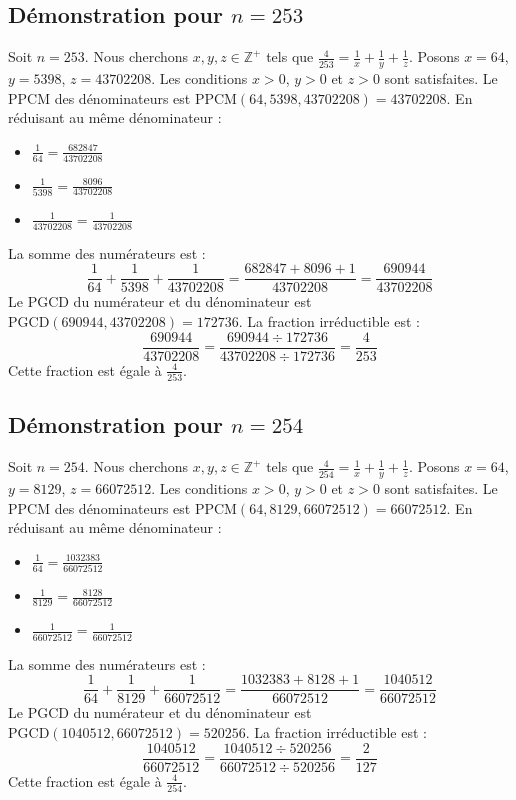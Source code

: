 \documentclass[11pt,a4paper]{article}
\begin{document}
\subsection{Démonstration pour $n = 253$}
Soit $n = 253$. Nous cherchons $x, y, z \in \mathbb{Z}^{+}$ tels que $\frac{4}{253} = \frac{1}{x} + \frac{1}{y} + \frac{1}{z}$.
Posons $x = 64$, $y = 5398$, $z = 43702208$.
Les conditions $x > 0$, $y > 0$ et $z > 0$ sont satisfaites.
Le PPCM des dénominateurs est $\text{PPCM}(64, 5398, 43702208) = 43702208$.
En réduisant au même dénominateur :
\begin{itemize}
    \item $\frac{1}{64} = \frac{682847}{43702208}$
    \item $\frac{1}{5398} = \frac{8096}{43702208}$
    \item $\frac{1}{43702208} = \frac{1}{43702208}$
\end{itemize}
La somme des numérateurs est :
$$ \frac{1}{64} + \frac{1}{5398} + \frac{1}{43702208} = \frac{682847 + 8096 + 1}{43702208} = \frac{690944}{43702208} $$
Le PGCD du numérateur et du dénominateur est $\text{PGCD}(690944, 43702208) = 172736$.
La fraction irréductible est :
$$ \frac{690944}{43702208} = \frac{690944 \div 172736}{43702208 \div 172736} = \frac{4}{253} $$
Cette fraction est égale à $\frac{4}{253}$.

\subsection{Démonstration pour $n = 254$}
Soit $n = 254$. Nous cherchons $x, y, z \in \mathbb{Z}^{+}$ tels que $\frac{4}{254} = \frac{1}{x} + \frac{1}{y} + \frac{1}{z}$.
Posons $x = 64$, $y = 8129$, $z = 66072512$.
Les conditions $x > 0$, $y > 0$ et $z > 0$ sont satisfaites.
Le PPCM des dénominateurs est $\text{PPCM}(64, 8129, 66072512) = 66072512$.
En réduisant au même dénominateur :
\begin{itemize}
    \item $\frac{1}{64} = \frac{1032383}{66072512}$
    \item $\frac{1}{8129} = \frac{8128}{66072512}$
    \item $\frac{1}{66072512} = \frac{1}{66072512}$
\end{itemize}
La somme des numérateurs est :
$$ \frac{1}{64} + \frac{1}{8129} + \frac{1}{66072512} = \frac{1032383 + 8128 + 1}{66072512} = \frac{1040512}{66072512} $$
Le PGCD du numérateur et du dénominateur est $\text{PGCD}(1040512, 66072512) = 520256$.
La fraction irréductible est :
$$ \frac{1040512}{66072512} = \frac{1040512 \div 520256}{66072512 \div 520256} = \frac{2}{127} $$
Cette fraction est égale à $\frac{4}{254}$.
\end{document}

